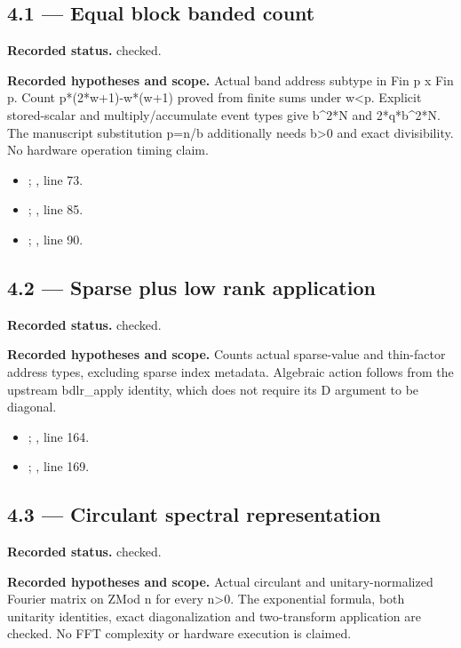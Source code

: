 \subsection{4.1 — Equal block banded count}
\label{result:4.1}
\textbf{Recorded status.} checked.

\textbf{Recorded hypotheses and scope.} Actual band address subtype in Fin p x Fin p. Count p*(2*w+1)-w*(w+1) proved from finite sums under w<p. Explicit stored-scalar and multiply/accumulate event types give b\textasciicircum{}2*N and 2*q*b\textasciicircum{}2*N. The manuscript substitution p=n/b additionally needs b>0 and exact divisibility. No hardware operation timing claim.

\begin{itemize}
\item {}; , line 73.
\item {}; , line 85.
\item {}; , line 90.
\end{itemize}
\subsection{4.2 — Sparse plus low rank application}
\label{result:4.2}
\textbf{Recorded status.} checked.

\textbf{Recorded hypotheses and scope.} Counts actual sparse-value and thin-factor address types, excluding sparse index metadata. Algebraic action follows from the upstream bdlr\_apply identity, which does not require its D argument to be diagonal.

\begin{itemize}
\item {}; , line 164.
\item {}; , line 169.
\end{itemize}
\subsection{4.3 — Circulant spectral representation}
\label{result:4.3}
\textbf{Recorded status.} checked.

\textbf{Recorded hypotheses and scope.} Actual circulant and unitary-normalized Fourier matrix on ZMod n for every n>0. The exponential formula, both unitarity identities, exact diagonalization and two-transform application are checked. No FFT complexity or hardware execution is claimed.

